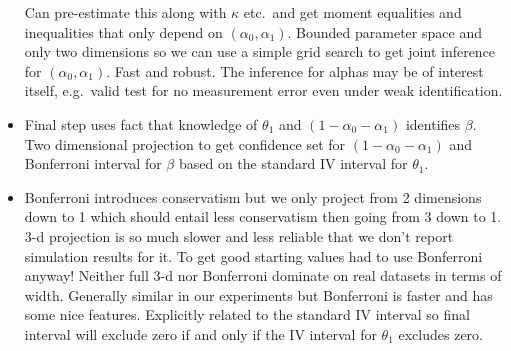 \begin{itemize}
    Can pre-estimate this along with $\kappa$ etc.\ and get moment equalities and inequalities that only depend on $(\alpha_0, \alpha_1)$.
    Bounded parameter space and only two dimensions so we can use a simple grid search to get joint inference for $(\alpha_0, \alpha_1)$.
    Fast and robust.
    The inference for alphas may be of interest itself, e.g.\ valid test for no measurement error even under weak identification.
  \item Final step uses fact that knowledge of $\theta_1$ and $(1 - \alpha_0 - \alpha_1)$ identifies $\beta$.
    Two dimensional projection to get confidence set for $(1 - \alpha_0 - \alpha_1)$ and Bonferroni interval for $\beta$ based on the standard IV interval for $\theta_1$.
  \item Bonferroni introduces conservatism but we only project from 2 dimensions down to 1 which should entail less conservatism then going from 3 down to 1.
    3-d projection is so much slower and less reliable that we don't report simulation results for it.
    To get good starting values had to use Bonferroni anyway!
    Neither full 3-d nor Bonferroni dominate on real datasets in terms of width.
    Generally similar in our experiments but Bonferroni is faster and has some nice features.
    Explicitly related to the standard IV interval so final interval will exclude zero if and only if the IV interval for $\theta_1$ excludes zero.
\end{itemize}

